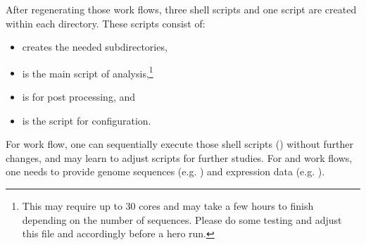 After regenerating those work flows,
three shell scripts and one  script are created
within each directory.  These scripts consist of:
\begin{itemize}
\item {} creates the needed subdirectories,
\item {} is the main script of analysis,\footnote{
This may require up to 30 cores and may take a few hours to finish
depending on the number of sequences. Please do some testing and adjust
this file and  accordingly before a hero run.
}
\item {} is for post processing, and
\item {} is the  script for  
configuration.
\end{itemize}
For  work flow, one can sequentially execute those shell scripts
() without further changes, and may learn to adjust scripts for 
further studies. For  and  work flows, one needs to 
provide genome sequences (e.g. )
and expression data (e.g. ).

